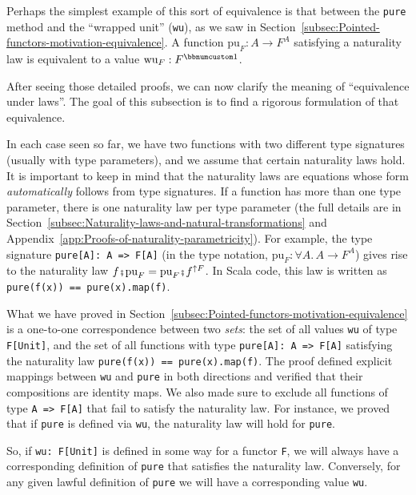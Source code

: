 Perhaps the simplest example of this sort of equivalence is that between
the \lstinline!pure! method and the \textsf{``}wrapped unit\textsf{''} (\lstinline!wu!),
as we saw in Section~\ref{subsec:Pointed-functors-motivation-equivalence}.
A function $\text{pu}_{F}:A\rightarrow F^{A}$ satisfying a naturality
law is equivalent to a value $\text{wu}_{F}:F^{\bbnum 1}$. 

After seeing those detailed proofs, we can now clarify the meaning
of \textsf{``}equivalence under laws\textsf{''}. The goal of this subsection is to
find a rigorous formulation of that equivalence.

In each case seen so far, we have two functions with two different
type signatures (usually with type parameters), and we assume that
certain naturality laws hold. It is important to keep in mind that
the naturality laws are equations whose form \emph{automatically}
follows from type signatures. If a function has more than one type
parameter, there is one naturality law per type parameter (the full
details are in Section~\ref{subsec:Naturality-laws-and-natural-transformations}
and Appendix~\ref{app:Proofs-of-naturality-parametricity}). For
example, the type signature \lstinline!pure[A]: A => F[A]! (in the
type notation, $\text{pu}_{F}:\forall A.\,A\rightarrow F^{A}$) gives
rise to the naturality law $f\bef\text{pu}_{F}=\text{pu}_{F}\bef f^{\uparrow F}$.
In Scala code, this law is written as \lstinline!pure(f(x)) == pure(x).map(f)!.

What we have proved in Section~\ref{subsec:Pointed-functors-motivation-equivalence}
is a one-to-one correspondence between two \emph{sets}: the set of
all values \lstinline!wu! of type \lstinline!F[Unit]!, and the set
of all functions with type \lstinline!pure[A]: A => F[A]! satisfying
the naturality law \lstinline!pure(f(x)) == pure(x).map(f)!. The
proof defined explicit mappings between \lstinline!wu! and \lstinline!pure!
in both directions and verified that their compositions are identity
maps. We also made sure to exclude all functions of type \lstinline!A => F[A]!
that fail to satisfy the naturality law. For instance, we proved that
if \lstinline!pure! is defined via \lstinline!wu!, the naturality
law will hold for \lstinline!pure!.

So, if \lstinline!wu: F[Unit]! is defined in some way for a functor
\lstinline!F!, we will always have a corresponding definition of
\lstinline!pure! that satisfies the naturality law. Conversely, for
any given lawful definition of \lstinline!pure! we will have a corresponding
value \lstinline!wu!.

